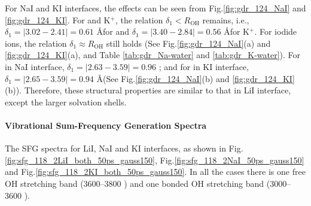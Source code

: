 For NaI and KI interfaces, the effects can be seen from Fig.\space\ref{fig:gdr_124_NaI} and \ref{fig:gdr_124_KI}. For \Na and K$^+$, 
the relation $\delta_1 < R_{\text{OH}}$ remains,
i.e., $\delta_1 = |3.02 - 2.41| = 0.61$ \AA for \Na and $\delta_1 = |3.40 - 2.84| = 0.56$ \AA  for K$^+$.
For iodide ions, the relation $\delta_1 \approx R_{\text{OH}}$ still holds (See Fig.\space\ref{fig:gdr_124_NaI}(a) and \ref{fig:gdr_124_KI}(a),
and Table \ref{tab:gdr_Na-water} and \ref{tab:gdr_K-water}). For \I in NaI interface, $\delta_1 = |2.63 - 3.59| = 0.96$ \A; 
and for \I in KI interface, $\delta_1 = |2.65 - 3.59| = 0.94$ \AA (See Fig.\space\ref{fig:gdr_124_NaI}(b) and \ref{fig:gdr_124_KI}(b)).
Therefore, these structural properties are similar to that in LiI interface, except the larger solvation shells.

\paragraph{Vibrational Sum-Frequency Generation Spectra}
%
The SFG spectra for LiI, NaI and KI interfaces, as shown in Fig.\space\ref{fig:sfg_118_2LiI_both_50ps_gauss150}, Fig.\space\ref{fig:sfg_118_2NaI_50ps_gauss150} and 
Fig.\space\ref{fig:sfg_118_2KI_both_50ps_gauss150}. In all the cases there is one free OH stretching band (3600--3800 \centimeter) and 
one bonded OH stretching band (3000--3600 \centimeter).
